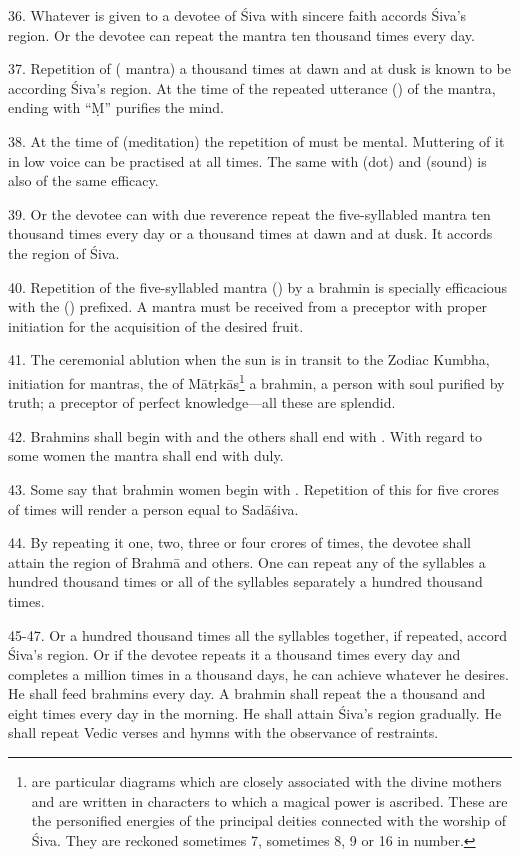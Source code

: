36. Whatever is given to a devotee of Śiva with sincere faith accords Śiva’s
region. Or the devotee can repeat the  mantra ten thousand times
every day.

37. Repetition of  ( mantra) a thousand times at dawn and at
dusk is known to be according Śiva’s region. At the time of the repeated
utterance () of the mantra, ending with “Ṃ” purifies the mind.

38. At the time of  (meditation) the repetition of  must
be mental. Muttering of it in low voice can be practised at all times. The same
with  (dot) and  (sound) is also of the same efficacy.

39. Or the devotee can with due reverence repeat the five-syllabled mantra ten
thousand times every day or a thousand times at dawn and at dusk. It accords
the region of Śiva.

40. Repetition of the five-syllabled mantra () by a brahmin is
specially efficacious with the  () prefixed. A mantra must be
received from a preceptor with proper initiation for the acquisition of
the desired fruit.

41. The ceremonial ablution when the sun is in transit to the Zodiac Kumbha,
initiation for mantras, the  of Mātṛkās\footnote{ are
particular diagrams which are closely associated with the divine mothers and are
written in characters to which a magical power is ascribed. These are
the personified energies of the principal deities connected with the worship of
Śiva. They are reckoned sometimes 7, sometimes 8, 9 or 16 in number.} a brahmin,
a person with soul purified by truth; a preceptor of perfect knowledge—all these
are splendid.

42. Brahmins shall begin with  and the others shall end with
. With regard to some women the mantra shall end with  duly.

43. Some say that brahmin women begin with . Repetition of this for
five crores of times will render a person equal to Sadāśiva.

44. By repeating it one, two, three or four crores of times, the devotee shall
attain the region of Brahmā and others. One can repeat any of the syllables
a hundred thousand times or all of the syllables separately a hundred thousand
times.

45-47. Or a hundred thousand times all the syllables together, if repeated,
accord Śiva’s region. Or if the devotee repeats it a thousand times every day
and completes a million times in a thousand days, he can achieve whatever he
desires. He shall feed brahmins every day. A brahmin shall repeat
the  a thousand and eight times every day in the morning. He shall
attain Śiva’s region gradually. He shall repeat Vedic verses and hymns with
the observance of restraints.


